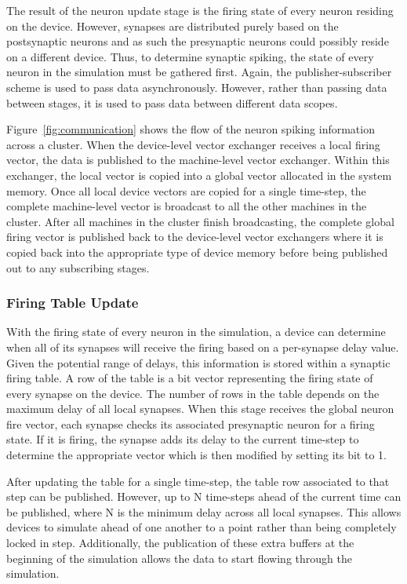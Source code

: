 The result of the neuron update stage is the firing state
of every neuron residing on the device. However, synapses are distributed
purely based on the postsynaptic neurons and as such the presynaptic
neurons could possibly reside on a different device. Thus, to determine
synaptic spiking, the state of every neuron in the simulation must be
gathered first. Again, the publisher-subscriber scheme is used to pass
data asynchronously. However, rather than passing data between stages,
it is used to pass data between different data scopes.

Figure~\ref{fig:communication} shows the flow of the neuron spiking information
across a cluster. When the device-level vector exchanger receives a
local firing vector, the data is published to the machine-level vector
exchanger. Within this exchanger, the local vector is copied into a
global vector allocated in the system memory. Once all local device
vectors are copied for a single time-step, the complete machine-level
vector is broadcast to all the other machines in the cluster. After all
machines in the cluster finish broadcasting, the complete global firing
vector is published back to the device-level vector exchangers where it
is copied back into the appropriate type of device memory before being
published out to any subscribing stages.

\subsubsection{Firing Table Update}

With the firing state of every neuron in the
simulation, a device can determine when all of its synapses will receive
the firing based on a per-synapse delay value. Given the potential
range of delays, this information is stored within a synaptic firing
table. A row of the table is a bit vector representing the firing state
of every synapse on the device. The number of rows in the table depends
on the maximum delay of all local synapses. When this stage receives the
global neuron fire vector, each synapse checks its associated presynaptic
neuron for a firing state. If it is firing, the synapse adds its delay
to the current time-step to determine the appropriate vector which is
then modified by setting its bit to 1.

After updating the table for a single time-step, the table row associated
to that step can be published. However, up to N time-steps ahead of the
current time can be published, where N is the minimum delay across all
local synapses. This allows devices to simulate ahead of one another to
a point rather than being completely locked in step. Additionally, the
publication of these extra buffers at the beginning of the simulation
allows the data to start flowing through the simulation.

